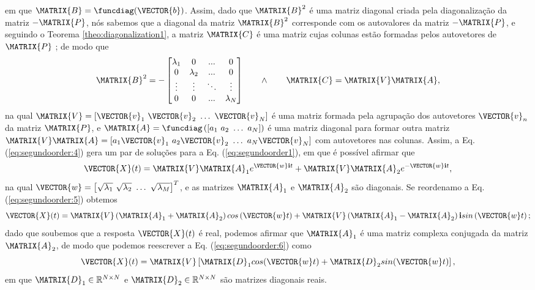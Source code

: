 \begin{myproofT}
em que $\MATRIX{B}=\funcdiag(\VECTOR{b})$. 
Assim, dado que $\MATRIX{B}^2$ é uma matriz diagonal criada pela diagonalização da  
matriz $-\MATRIX{P}$, nós sabemos que
a diagonal da matriz $\MATRIX{B}^2$ corresponde com os autovalores da matriz $-\MATRIX{P}$,
e seguindo o Teorema \ref{theo:diagonalization1}, a matriz $\MATRIX{C}$ é uma matriz cujas colunas estão formadas pelos 
autovetores de $\MATRIX{P}$ \cite[pp. 67]{golub2013matrix}; de modo que
\begin{equation}\label{eq:segundoorder:4}
\MATRIX{B}^2=-
\begin{bmatrix}
\lambda_1 & 0         & ...    & 0 \\
0         & \lambda_2 & ...    & 0 \\
\vdots    & \vdots    & \ddots & \vdots \\
0         & 0         & ...    & \lambda_N
\end{bmatrix}
\qquad \wedge \qquad \MATRIX{C}=\MATRIX{V}\MATRIX{A}, 
\end{equation}
na qual $\MATRIX{V}=\left[ \VECTOR{v}_1~  \VECTOR{v}_2~  \dots~ \VECTOR{v}_N\right]$ 
é uma matriz formada pela agrupação dos autovetores $\VECTOR{v}_n$ da matriz $\MATRIX{P}$,
e $\MATRIX{A}=\funcdiag\left(\left[ a_1~  a_2~  \dots~ a_N\right]\right)$ 
é uma matriz diagonal para formar outra matriz  
$\MATRIX{V}\MATRIX{A}=\left[ a_1\VECTOR{v}_1~  a_2\VECTOR{v}_2~  \dots~ a_N\VECTOR{v}_N\right]$
com autovetores nas colunas.
Assim, a Eq. (\ref{eq:segundoorder:4}) gera um par de soluções para a Eq. (\ref{eq:segundoorder1}),
em que é possível afirmar que
\begin{equation}\label{eq:segundoorder:5}
\VECTOR{X}(t)=\MATRIX{V}\MATRIX{A}_1 e^{\VECTOR{w} \mathbf{i} t}+ \MATRIX{V}\MATRIX{A}_2 e^{-\VECTOR{w} \mathbf{i} t},
\end{equation}
na qual $\VECTOR{w}=\left[ \sqrt{\lambda_1}~ \sqrt{\lambda_2}~ \dots~ \sqrt{\lambda_M}\right]^{T}$, 
e as matrizes
$\MATRIX{A}_1$ e $\MATRIX{A}_2$ são diagonais.
Se reordenamo a Eq. (\ref{eq:segundoorder:5}) obtemos
\begin{equation}\label{eq:segundoorder:6}
\VECTOR{X}(t)=
\MATRIX{V}\left(\MATRIX{A}_1+\MATRIX{A}_2\right) cos\left(\VECTOR{w}  t\right)+ 
\MATRIX{V}\left(\MATRIX{A}_1-\MATRIX{A}_2\right) \mathbf{i} sin\left(\VECTOR{w}  t\right);
\end{equation}
dado que soubemos que a resposta $\VECTOR{X}(t)$ é real, 
podemos afirmar que $\MATRIX{A}_1$ é uma matriz complexa conjugada da matriz $\MATRIX{A}_2$,
de modo que podemos reescrever a Eq. (\ref{eq:segundoorder:6}) como
\begin{equation}\label{eq:segundoorder:7}
 \VECTOR{X}(t)= \MATRIX{V}\left[\MATRIX{D}_1 cos(\VECTOR{w}t) + \MATRIX{D}_2 sin(\VECTOR{w}t) \right],
\end{equation}
em que $\MATRIX{D}_1 \in \mathbb{R}^{N\times N}$ e $\MATRIX{D}_2 \in \mathbb{R}^{N\times N}$ 
são matrizes diagonais reais. 
\end{myproofT}
